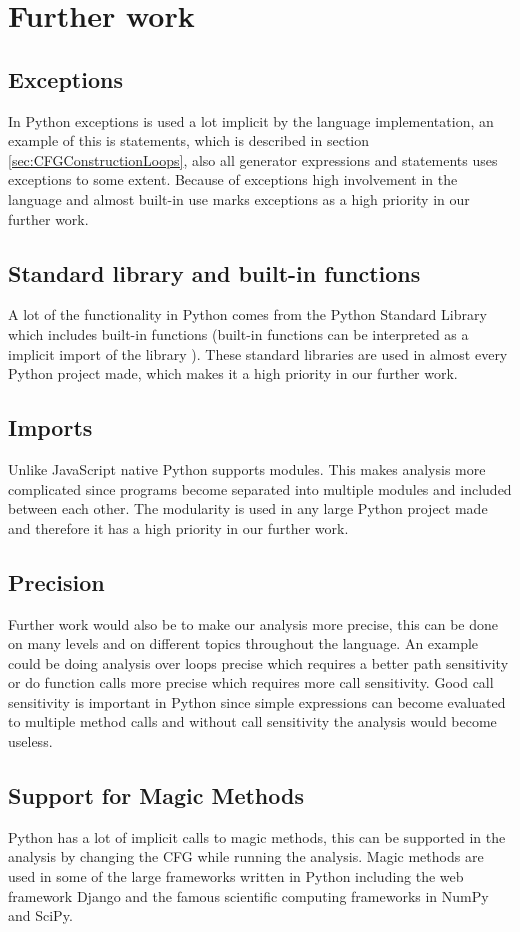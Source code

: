 \chapter{Further work}

\section{Exceptions}
In Python exceptions is used a lot implicit by the language implementation, an example of this is  statements, which is described in section \ref{sec:CFGConstructionLoops}, also all generator expressions and  statements uses exceptions to some extent. Because of exceptions high involvement in the language and almost built-in use marks exceptions as a high priority in our further work.

\section{Standard library and built-in functions}
A lot of the functionality  in Python comes from the Python Standard Library which includes built-in functions (built-in functions can be interpreted as a implicit import of the library ). These standard libraries are used in almost every Python project made, which makes it a high priority in our further work.

\section{Imports}
Unlike JavaScript native Python supports modules. This makes analysis more complicated since programs become separated  into multiple modules and included between each other. The modularity is used in any large Python project made and therefore it has a high priority in our further work.

\section{Precision}
Further work would also be to make our analysis more precise, this can be done on many levels and on different topics throughout the language. An example could be doing analysis over loops precise which requires a better path sensitivity or do function calls more precise which requires more call sensitivity. Good call sensitivity is important in Python since simple expressions can become evaluated to multiple method calls and without call sensitivity the analysis would become useless. 

\section{Support for Magic Methods}
Python has a lot of implicit calls to magic methods, this can be supported in the analysis by changing  the CFG while running the analysis. Magic methods are used in some of the large frameworks written in Python including the web framework Django and the famous scientific computing frameworks in NumPy and SciPy.
